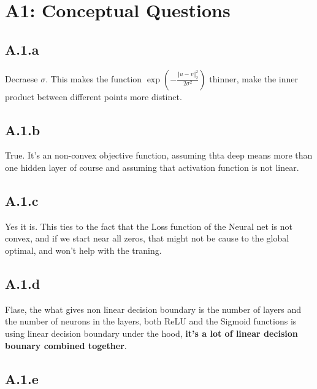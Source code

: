 \documentclass[]{article}
\begin{document}
\section*{A1: Conceptual Questions}
    \subsection*{A.1.a}
        Decraese $\sigma$. This makes the function $\exp\left(
            - \frac{\Vert u - v\Vert_2^2}{2\sigma^2} 
        \right)$ thinner, make the inner product between different points more distinct. 
    \subsection*{A.1.b}
        True. It's an non-convex objective function, assuming thta deep means more than one hidden layer of course and assuming that activation function is not linear. 
    \subsection*{A.1.c}
        Yes it is. This ties to the fact that the Loss function of the Neural net is not convex, and if we start near all zeros, that might not be cause to the global optimal, and won't help with the traning. 
    \subsection*{A.1.d}
        Flase, the what gives non linear decision boundary is the number of layers and the number of neurons in the layers, both ReLU and the Sigmoid functions is using linear decision boundary under the hood, \textbf{it's a lot of linear decision bounary combined together}. 
    \subsection*{A.1.e}
\end{document}
